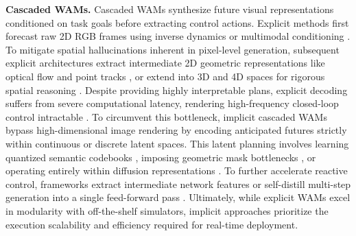 \documentclass{llmxive}
\begin{document}
\textbf{Cascaded WAMs.}
Cascaded WAMs synthesize future visual representations conditioned on task goals before extracting control actions. Explicit methods first forecast raw 2D RGB frames using inverse dynamics or multimodal conditioning \cite{du2023learning,du2024video,intelligence2026pi}. To mitigate spatial hallucinations inherent in pixel-level generation, subsequent explicit architectures extract intermediate 2D geometric representations like optical flow and point tracks \cite{ko2024learning,bharadhwaj2024track2act,xu2024flow}, or extend into 3D and 4D spaces for rigorous spatial reasoning \cite{zhi20253dflowaction,wang2026mvista}. Despite providing highly interpretable plans, explicit decoding suffers from severe computational latency, rendering high-frequency closed-loop control intractable \cite{yan2026s}. To circumvent this bottleneck, implicit cascaded WAMs bypass high-dimensional image rendering by encoding anticipated futures strictly within continuous or discrete latent spaces. This latent planning involves learning quantized semantic codebooks \cite{ye2025latent}, imposing geometric mask bottlenecks \cite{lou2026mask}, or operating entirely within diffusion representations \cite{huang2024ardup}. To further accelerate reactive control, frameworks extract intermediate network features \cite{hu2024video} or self-distill multi-step generation into a single feed-forward pass  \cite{yan2026s}. Ultimately, while explicit WAMs excel in modularity with off-the-shelf simulators, implicit approaches prioritize the execution scalability and efficiency required for real-time deployment.
\end{document}

